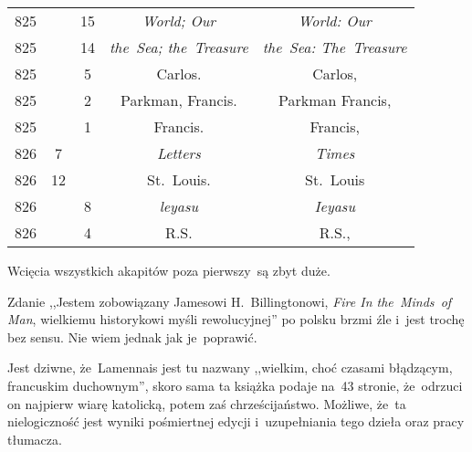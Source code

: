 \documentclass[a4paper,11pt]{article}
\begin{document}
\begin{center}
\begin{tabular}{|c|c|c|c|c|}
    825 & & 15 & \emph{World; Our} & \emph{World: Our} \\
    825 & & 14 & \emph{the~Sea; the~Treasure} & \emph{the~Sea:
                                                The~Treasure} \\
    825 & &  5 & Carlos. & Carlos, \\
    825 & &  2 & Parkman, Francis. & Parkman Francis, \\
    825 & &  1 & Francis. & Francis, \\
    826 &  7 & & \emph{Letters} & \emph{Times} \\
    826 & 12 & & St.~Louis. & St.~Louis \\
    826 & &  8 & \emph{leyasu} & \emph{Ieyasu} \\
    826 & &  4 & R.S. & R.S., \\
    \hline
  \end{tabular}
\end{center}

\vspace{\spaceTwo}








\start {} Wcięcia wszystkich akapitów poza pierwszy~są zbyt
duże.

\vspace{\spaceFour}


\start {} Zdanie ,,Jestem zobowiązany Jamesowi
H.~Billingtonowi, \emph{Fire In the~Minds~of Man}, wielkiemu
historykowi myśli rewolucyjnej'' po polsku brzmi źle i~jest trochę bez
sensu. Nie wiem jednak jak je~poprawić.

\vspace{\spaceFour}


\start {} Jest dziwne, że~Lamennais jest tu nazwany ,,wielkim,
choć czasami błądzącym, francuskim duchownym'', skoro sama ta książka
podaje na~43 stronie, że~odrzuci on najpierw wiarę katolicką, potem
zaś chrześcijaństwo. Możliwe, że~ta nielogiczność jest wyniki
pośmiertnej edycji i~uzupełniania tego dzieła oraz pracy tłumacza.

\vspace{\spaceFour}
\end{document}
